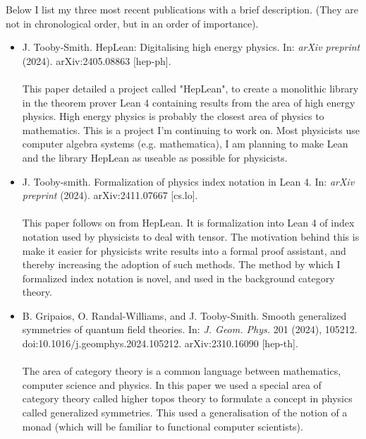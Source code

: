 \documentclass[14pt,letter]{article}
\newcommand{\mybullet}{\textcolor{mycolor}{$\ast$}\ }
\newcounter{customtitle}
\begin{document}
\vspace{0.3cm}
Below I list my three most recent publications with a brief description.
(They are not in chronological order, but in an order of importance).
\begin{itemize}[label=\mybullet]


\item J. Tooby-Smith. {\color{mycolor} HepLean: Digitalising high energy physics}. In: \emph{arXiv preprint} (2024). arXiv:2405.08863 [hep-ph].
~\\ 
~\\ This paper detailed a project called "HepLean", to create a monolithic library in the theorem prover Lean 4 containing results from the area of high energy physics. High energy physics is probably the closest area of physics to mathematics. This is a project I'm continuing to work on. Most physicists use computer algebra systems (e.g. mathematica), I am planning to make Lean and the library HepLean as useable as possible for physicists. 
 
 \item J. Tooby-smith.  {\color{mycolor} Formalization of physics index notation in Lean 4}. In: \emph{arXiv preprint} (2024). arXiv:2411.07667  [cs.lo].
~\\ 
~\\ This paper follows on from HepLean. It is formalization into Lean 4 of index notation used by physicists to deal with tensor. The motivation behind this is make it easier for physicists write results into a formal proof assistant, and thereby increasing the adoption of such methods. The method by which I formalized index notation is novel, and used in the background category theory. 

 \item  B. Gripaios, O. Randal-Williams, and J. Tooby-Smith. {\color{mycolor} Smooth generalized symmetries of quantum field theories}. In: \emph{J. Geom. Phys.} 201 (2024), 105212. doi:10.1016/j.geomphys.2024.105212. arXiv:2310.16090 [hep-th]. 
~\\
~\\The area of category theory is a common language between mathematics, computer science and physics. In this paper we used a special area of category theory called higher topos theory to formulate a concept in physics called generalized symmetries. This used a generalisation of the notion of a monad (which will be familiar to functional computer scientists).
 
\end{itemize}
\end{document}
